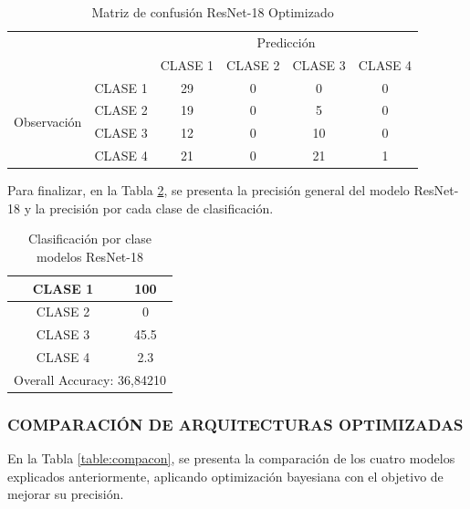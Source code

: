 \newpage
\begin{table}[htbp]
	\centering
	\begin{tabular}{|c|l|c|c|c|c|}
		\hline
		\multicolumn{2}{|c|}{\multirow{2}[4]{*}{}} & \multicolumn{4}{c|}{Predicción} \bigstrut\\
		\cline{3-6}    \multicolumn{2}{|c|}{} & CLASE 1 & CLASE 2 & CLASE 3 & CLASE 4 \bigstrut\\
		\hline
		\multirow{4}[8]{*}{\begin{sideways}Observación\end{sideways}} & CLASE 1 & 29     & 0     & 0    & 0 \bigstrut\\
		\cline{2-6}          & CLASE 2 & 19     & 0     & 5    & 0 \bigstrut\\
		\cline{2-6}          & CLASE 3 & 12     & 0     & 10    & 0 \bigstrut\\
		\cline{2-6}          & CLASE 4 & 21     & 0     & 21    & 1 \bigstrut\\
		\hline
	\end{tabular}%
	\caption{Matriz de confusión ResNet-18 Optimizado }
	\label{tab:MC_resnet_OPT}%
\end{table}%
Para finalizar, en la Tabla \ref{tab:resnetoptclases}, se presenta la precisión general del modelo ResNet-18 y la precisión por cada clase de clasificación.
\begin{table}[htbp]
	\centering
	\begin{tabular}{|c|c|}
		\hline
		CLASE 1 & 100 \bigstrut\\
		\hline
		CLASE 2 & 0 \bigstrut\\
		\hline
		CLASE 3 & 45.5 \bigstrut\\
		\hline
		CLASE 4 & 2.3 \bigstrut\\
		\hline
		\multicolumn{2}{|c|}{Overall Accuracy: 36,84210} \bigstrut\\
		\hline
	\end{tabular}%
	\caption{Clasificación por clase modelos ResNet-18}
	\label{tab:resnetoptclases}%
\end{table}%


\subsubsection{\MakeUppercase{Comparación de Arquitecturas Optimizadas}}

En la Tabla \ref{table:compacon}, se presenta la comparación de los cuatro modelos explicados anteriormente, aplicando optimización bayesiana con el objetivo de mejorar su precisión.

